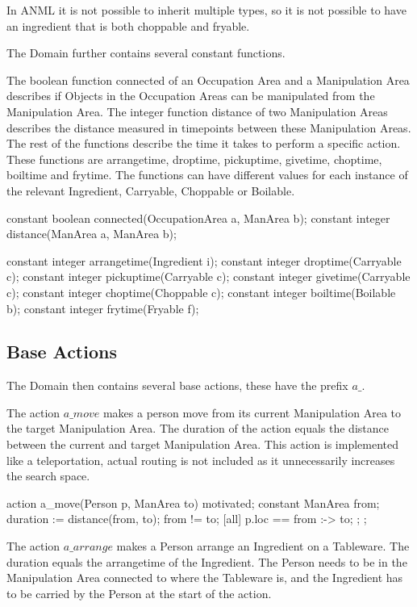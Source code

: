 In \ac{ANML} it is not possible to inherit multiple types, so it is not possible to have an ingredient that is both choppable and fryable.

The Domain further contains several constant functions.

The boolean function connected of an Occupation Area and a Manipulation Area describes if Objects in the Occupation Areas can be manipulated from the Manipulation Area.
The integer function distance of two Manipulation Areas describes the distance measured in timepoints between these Manipulation Areas.
The rest of the functions describe the time it takes to perform a specific action.
These functions are arrangetime, droptime, pickuptime, givetime, choptime, boiltime and frytime.
The functions can have different values for each instance of the relevant Ingredient, Carryable, Choppable or Boilable.

\begin{anmlcode}
constant boolean connected(OccupationArea a, ManArea b);
constant integer distance(ManArea a, ManArea b);

constant integer arrangetime(Ingredient i);
constant integer droptime(Carryable c);
constant integer pickuptime(Carryable c);
constant integer givetime(Carryable c);
constant integer choptime(Choppable c);
constant integer boiltime(Boilable b);
constant integer frytime(Fryable f);
\end{anmlcode}


\subsection{Base Actions}
The Domain then contains several base actions, these have the prefix $a\_$.

The action $a\_move$ makes a person move from its current Manipulation Area to the target Manipulation Area.
The duration of the action equals the distance between the current and target Manipulation Area.
This action is implemented like a teleportation, actual routing is not included as it unnecessarily increases the search space.

\begin{anmlcode}
action a_move(Person p, ManArea to) {
  motivated;
  constant ManArea from;
  duration := distance(from, to);
  from != to;
  [all] {
    p.loc == from :-> to;
  };
};
\end{anmlcode}

The action $a\_arrange$ makes a Person arrange an Ingredient on a Tableware.
The duration equals the arrangetime of the Ingredient.
The Person needs to be in the Manipulation Area connected to where the Tableware is, and the Ingredient has to be carried by the Person at the start of the action.

